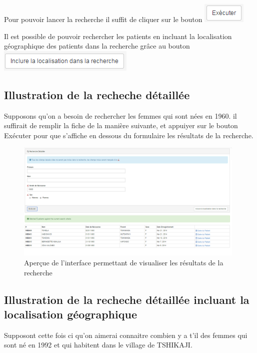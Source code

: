 \documentclass[12pt,a4paper]{report}
\begin{document}
Pour pouvoir lancer la recherche il suffit de cliquer sur le bouton \includegraphics[scale=0.7]{pic/ExeButton.png}

Il est possible de pouvoir rechercher les patients en incluant la localisation géographique des patients dans la recherche grâce au bouton \includegraphics[scale=0.7]{pic/LocalisationRecherche.png}

\subsection{Illustration de la recheche détaillée}
Supposons qu'on a besoin de rechercher les femmes qui sont nées en 1960. il suffirait de remplir la fiche de la manière suivante, et appuiyer sur le bouton Exécuter pour que s'affiche en dessous du formulaire les résultats de la recherche. 

\begin{figure}[h]
\begin{center}
\includegraphics[width=11cm]{pic/RechecheDetailler.png}
\end{center}
\caption{Aperçue de l'interface permettant de visualiser les résultats de la recherche}
\label{Aperçue de l'interface permettant de visualiser les résultats de la recherche}
\end{figure} 

\subsection{Illustration de la recheche détaillée incluant la localisation géographique}
Supposont cette fois ci qu'on aimerai connaitre combien y a t'il des femmes qui sont né en 1992 et qui habitent dans le village de TSHIKAJI.
\end{document}
